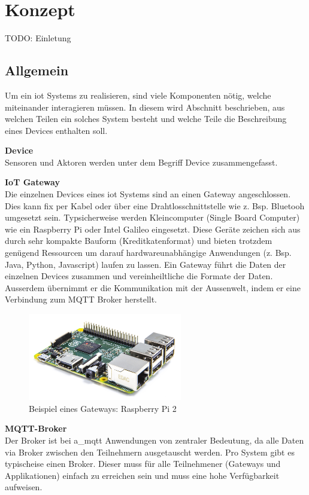 \chapter{Konzept}
\label{chap:konzept}

TODO: Einletung

\section{Allgemein}

Um ein \gls{iot} Systems zu realisieren, sind viele Komponenten nötig, welche miteinander interagieren müssen. In diesem wird Abschnitt beschrieben, aus welchen Teilen ein solches System besteht und welche Teile die Beschreibung eines Devices enthalten soll.

\textbf{Device} \\
Sensoren und Aktoren werden unter dem Begriff Device zusammengefasst.


\textbf{IoT Gateway} \\
Die einzelnen Devices eines \gls{iot} Systems sind an einen Gateway angeschlossen. Dies kann fix per Kabel oder über eine Drahtlosschnittstelle wie z. Bsp. Bluetooh umgesetzt sein. Typsicherweise werden Kleincomputer (Single Board Computer) wie ein Raspberry Pi oder Intel Galileo eingesetzt. Diese Geräte zeichen sich aus durch sehr kompakte Bauform (Kreditkatenformat) und bieten trotzdem genügend Ressourcen um darauf hardwareunabhängige Anwendungen (z. Bsp. Java, Python, Javascript) laufen zu lassen. 
Ein Gateway führt die Daten der einzelnen Devices zusammen und vereinheiltliche die Formate der Daten. Ausserdem übernimmt er die Kommunikation mit der Aussenwelt, indem er eine Verbindung zum MQTT Broker herstellt.

\begin{figure}[H]
	\centering
		\includegraphics[width=0.6\textwidth]{bilder/raspi_2.jpg}
	\caption{Beispiel eines Gateways: Raspberry Pi 2}
\end{figure}

\textbf{MQTT-Broker} \\
Der Broker ist bei \acrshort{a_mqtt} Anwendungen von zentraler Bedeutung, da alle Daten via Broker zwischen den Teilnehmern ausgetauscht werden. Pro System gibt es typischeise einen Broker. Dieser muss für alle Teilnehmener (Gateways und Applikationen) einfach zu erreichen sein und muss eine hohe Verfügbarkeit aufweisen.

